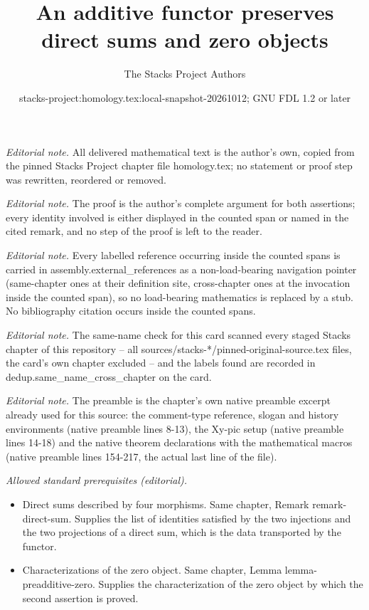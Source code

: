 \documentclass[10pt,a4paper]{amsart}
\title{An additive functor preserves direct sums and zero objects}
\author{The Stacks Project Authors}
\date{stacks-project:homology.tex:local-snapshot-20261012; GNU FDL 1.2 or later}
\theoremstyle{plain}
\theoremstyle{definition}
\theoremstyle{remark}
\numberwithin{equation}{subsection}
\begin{document}
\maketitle
\noindent\textit{Editorial note.} All delivered mathematical text is the author's own, copied from the pinned Stacks Project chapter file homology.tex; no statement or proof step was rewritten, reordered or removed.\par\medskip
\noindent\textit{Editorial note.} The proof is the author's complete argument for both assertions; every identity involved is either displayed in the counted span or named in the cited remark, and no step of the proof is left to the reader.\par\medskip
\noindent\textit{Editorial note.} Every labelled reference occurring inside the counted spans is carried in assembly.external\_references as a non-load-bearing navigation pointer (same-chapter ones at their definition site, cross-chapter ones at the invocation inside the counted span), so no load-bearing mathematics is replaced by a stub. No bibliography citation occurs inside the counted spans.\par\medskip
\noindent\textit{Editorial note.} The same-name check for this card scanned every staged Stacks chapter of this repository -- all sources/stacks-*/pinned-original-source.tex files, the card's own chapter excluded -- and the labels found are recorded in dedup.same\_name\_cross\_chapter on the card.\par\medskip
\noindent\textit{Editorial note.} The preamble is the chapter's own native preamble excerpt already used for this source: the comment-type reference, slogan and history environments (native preamble lines 8-13), the Xy-pic setup (native preamble lines 14-18) and the native theorem declarations with the mathematical macros (native preamble lines 154-217, the actual last line of the file).\par\medskip
\noindent\textit{Allowed standard prerequisites (editorial).}\begin{itemize}
\item Direct sums described by four morphisms. Same chapter, Remark remark-direct-sum. Supplies the list of identities satisfied by the two injections and the two projections of a direct sum, which is the data transported by the functor.
\item Characterizations of the zero object. Same chapter, Lemma lemma-preadditive-zero. Supplies the characterization of the zero object by which the second assertion is proved.
\end{itemize}\medskip
\end{document}
